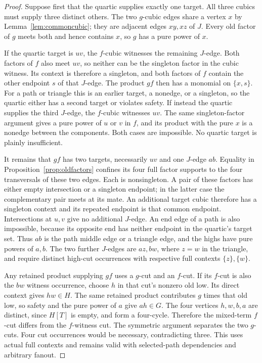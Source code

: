 \documentclass[11pt]{article}
\theoremstyle{definition}
\theoremstyle{remark}
\begin{document}
\begin{proof}
Suppose first that the quartic supplies exactly one target. All three cubics must supply three distinct others. The two $g$-cubic edges share a vertex $x$ by Lemma~\ref{lem:commoncubic}; they are adjacent edges $xy,xz$ of $J$. Every old factor of $g$ meets both and hence contains $x$, so $g$ has a pure power of $x$.

If the quartic target is $uv$, the $f$-cubic witnesses the remaining $J$-edge. Both factors of $f$ also meet $uv$, so neither can be the singleton factor in the cubic witness. Its context is therefore a singleton, and both factors of $f$ contain the other endpoint $s$ of that $J$-edge. The product $gf$ then has a monomial on $\{x,s\}$. For a path or triangle this is an earlier target, a nonedge, or a singleton, so the quartic either has a second target or violates safety. If instead the quartic supplies the third $J$-edge, the $f$-cubic witnesses $uv$. The same singleton-factor argument gives a pure power of $u$ or $v$ in $f$, and its product with the pure $x$ is a nonedge between the components. Both cases are impossible. No quartic target is plainly insufficient.

It remains that $gf$ has two targets, necessarily $uv$ and one $J$-edge $ab$. Equality in Proposition~\ref{prop:oldfactors} confines its four full factor supports to the four transversals of these two edges. Each is nonsingleton. A pair of these factors has either empty intersection or a singleton endpoint; in the latter case the complementary pair meets at its mate. An additional target cubic therefore has a singleton context and its repeated endpoint is that common endpoint. Intersections at $u,v$ give no additional $J$-edge. An end edge of a path is also impossible, because its opposite end has neither endpoint in the quartic's target set. Thus $ab$ is the path middle edge or a triangle edge, and the highs have pure powers of $a,b$. The two further $J$-edges are $az,bw$, where $z=w$ in the triangle, and require distinct high-cut occurrences with respective full contexts $\{z\},\{w\}$.

Any retained product supplying $gf$ uses a $g$-cut and an $f$-cut. If its $f$-cut is also the $bw$ witness occurrence, choose $h$ in that cut's nonzero old low. Its direct context gives $hw\in H$. The same retained product contributes $g$ times that old low, so safety and the pure power of $a$ give $ah\in G$. The four vertices $h,w,b,a$ are distinct, since $H[T]$ is empty, and form a four-cycle. Therefore the mixed-term $f$-cut differs from the $f$-witness cut. The symmetric argument separates the two $g$-cuts. Four cut occurrences would be necessary, contradicting three. This uses actual full contexts and remains valid with selected-path dependencies and arbitrary fanout.
\end{proof}
\end{document}
